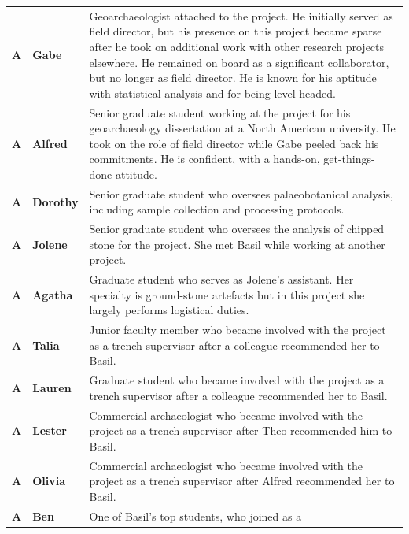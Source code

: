 \documentclass[
]{article}
\begin{document}
\begin{longtable}[]{@{}
  >{\raggedright\arraybackslash}p{}
  >{\raggedright\arraybackslash}p{}
  >{\raggedright\arraybackslash}p{}@{}}
\toprule\noalign{}
\endhead
\bottomrule\noalign{}
\endlastfoot
\textbf{A} & \textbf{Gabe} & Geoarchaeologist attached to the project.
He initially served as field director, but his presence on this project
became sparse after he took on additional work with other research
projects elsewhere. He remained on board as a significant collaborator,
but no longer as field director. He is known for his aptitude with
statistical analysis and for being level-headed. \\
\textbf{A} & \textbf{Alfred} & Senior graduate student working at the
project for his geoarchaeology dissertation at a North American
university. He took on the role of field director while Gabe peeled back
his commitments. He is confident, with a hands-on, get-things-done
attitude. \\
\textbf{A} & \textbf{Dorothy} & Senior graduate student who oversees
palaeobotanical analysis, including sample collection and processing
protocols. \\
\textbf{A} & \textbf{Jolene} & Senior graduate student who oversees the
analysis of chipped stone for the project. She met Basil while working
at another project. \\
\textbf{A} & \textbf{Agatha} & Graduate student who serves as Jolene's
assistant. Her specialty is ground-stone artefacts but in this project
she largely performs logistical duties. \\
\textbf{A} & \textbf{Talia} & Junior faculty member who became involved
with the project as a trench supervisor after a colleague recommended
her to Basil. \\
\textbf{A} & \textbf{Lauren} & Graduate student who became involved with
the project as a trench supervisor after a colleague recommended her to
Basil. \\
\textbf{A} & \textbf{Lester} & Commercial archaeologist who became
involved with the project as a trench supervisor after Theo recommended
him to Basil. \\
\textbf{A} & \textbf{Olivia} & Commercial archaeologist who became
involved with the project as a trench supervisor after Alfred
recommended her to Basil. \\
\textbf{A} & \textbf{Ben} & One of Basil's top students, who joined as a

\end{longtable}
\end{document}
